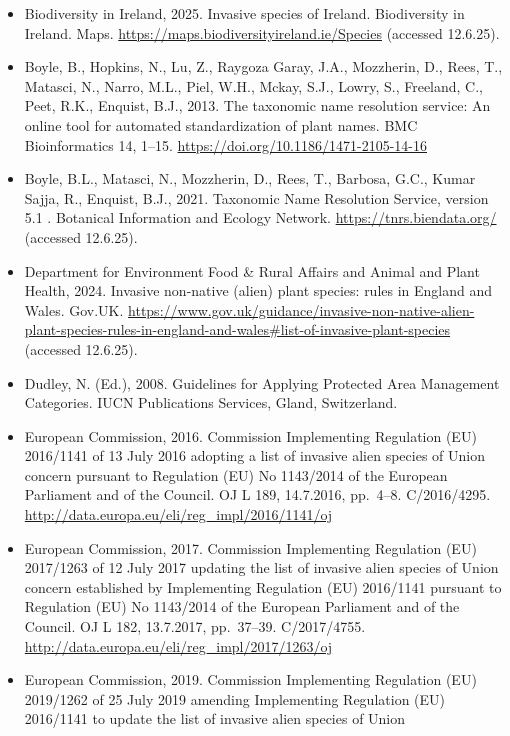 \documentclass[
]{article}
\providecommand{\tightlist}{%
  \setlength{\itemsep}{0pt}\setlength{\parskip}{0pt}}
\begin{document}
\begin{itemize}
\tightlist
\item
  Biodiversity in Ireland, 2025. Invasive species of Ireland.
  Biodiversity in Ireland. Maps.
  \url{https://maps.biodiversityireland.ie/Species} (accessed 12.6.25).
\item
  Boyle, B., Hopkins, N., Lu, Z., Raygoza Garay, J.A., Mozzherin, D.,
  Rees, T., Matasci, N., Narro, M.L., Piel, W.H., Mckay, S.J., Lowry,
  S., Freeland, C., Peet, R.K., Enquist, B.J., 2013. The taxonomic name
  resolution service: An online tool for automated standardization of
  plant names. BMC Bioinformatics 14, 1--15.
  \url{https://doi.org/10.1186/1471-2105-14-16}
\item
  Boyle, B.L., Matasci, N., Mozzherin, D., Rees, T., Barbosa, G.C.,
  Kumar Sajja, R., Enquist, B.J., 2021. Taxonomic Name Resolution
  Service, version 5.1 . Botanical Information and Ecology Network.
  \url{https://tnrs.biendata.org/} (accessed 12.6.25).
\item
  Department for Environment Food \& Rural Affairs and Animal and Plant
  Health, 2024. Invasive non-native (alien) plant species: rules in
  England and Wales. Gov.UK.
  \url{https://www.gov.uk/guidance/invasive-non-native-alien-plant-species-rules-in-england-and-wales\#list-of-invasive-plant-species}
  (accessed 12.6.25).
\item
  Dudley, N. (Ed.), 2008. Guidelines for Applying Protected Area
  Management Categories. IUCN Publications Services, Gland, Switzerland.
\item
  European Commission, 2016. Commission Implementing Regulation (EU)
  2016/1141 of 13 July 2016 adopting a list of invasive alien species of
  Union concern pursuant to Regulation (EU) No 1143/2014 of the European
  Parliament and of the Council. OJ L 189, 14.7.2016, pp.~4--8.
  C/2016/4295. \url{http://data.europa.eu/eli/reg_impl/2016/1141/oj}
\item
  European Commission, 2017. Commission Implementing Regulation (EU)
  2017/1263 of 12 July 2017 updating the list of invasive alien species
  of Union concern established by Implementing Regulation (EU) 2016/1141
  pursuant to Regulation (EU) No 1143/2014 of the European Parliament
  and of the Council. OJ L 182, 13.7.2017, pp.~37--39. C/2017/4755.
  \url{http://data.europa.eu/eli/reg_impl/2017/1263/oj}
\item
  European Commission, 2019. Commission Implementing Regulation (EU)
  2019/1262 of 25 July 2019 amending Implementing Regulation (EU)
  2016/1141 to update the list of invasive alien species of Union

\end{itemize}
\end{document}
